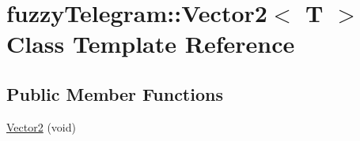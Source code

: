 \hypertarget{classfuzzy_telegram_1_1_vector2}{}\section{fuzzy\+Telegram\+:\+:Vector2$<$ T $>$ Class Template Reference}
\label{classfuzzy_telegram_1_1_vector2}
\subsection*{Public Member Functions}
\begin{DoxyCompactItemize}
\item 
\hyperlink{classfuzzy_telegram_1_1_vector2_ad133459d85743e14f62616f2f2631bd9}{Vector2} (void)\hypertarget{classfuzzy_telegram_1_1_vector2_ad133459d85743e14f62616f2f2631bd9}{}\label{classfuzzy_telegram_1_1_vector2_ad133459d85743e14f62616f2f2631bd9}


\end{DoxyCompactItemize}
